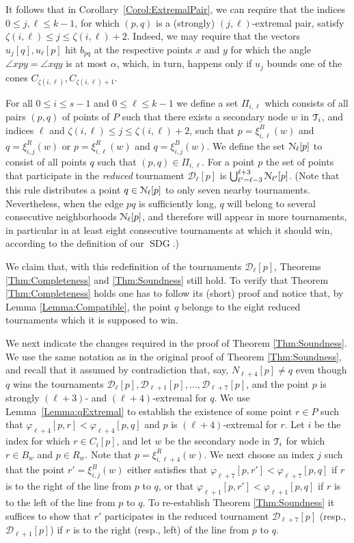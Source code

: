 \documentclass[letter,11pt]{article}
\def\NN{\EuScript{N}}
\def\dirtour{{\mathcal D}}
\def\T{\EuScript{T}}
\def\bisect{b}
\def\SDG{\mathop{\mathrm{SDG}}}
\begin{document}
It follows that in Corollary~\ref{Corol:ExtremalPair},
we can require that the indices $0\leq j,\ell\leq k-1$, for which
$(p,q)$ is a (strongly) $(j,\ell)$-extremal pair, satisfy 
$\zeta(i,\ell) \le j \le \zeta(i,\ell)+2$.  
Indeed, we may require that the vectors $u_j[q],u_{\ell}[p]$ hit $\bisect_{pq}$ at the respective points $x$ and $y$ for which the angle $\angle xpy=\angle xqy$ is at most $\alpha$, which, in turn, happens only if $u_j$ bounds one of the cones $C_{\zeta(i,\ell)},C_{\zeta(i,\ell)+1}$.


For all $0\le i \le s-1$ and $0\le \ell\leq k-1$ we define a set $\Pi_{i,\ell}$ which
consists of all pairs $(p,q)$ of points of $P$ such that there exists a
secondary node $w$ in $\T_i$, and indices $\ell$ and $\zeta(i,\ell)
\le j \le \zeta(i,\ell)+2$, such that $p=\xi_{i,\ell}^B(w)$ and
$q=\xi_{i,j}^R(w)$ or  $p=\xi_{i,\ell}^R(w)$
and $q=\xi_{i,j}^B(w)$.  We define the set $\NN_\ell[p]$ to consist of
all points $q$ such that  $(p,q) \in \Pi_{i,\ell}$.
For a point $p$ the set of points that participate in the 
{\em reduced} tournament $\dirtour_\ell[p]$ is 
$\bigcup_{\ell'=\ell-3}^{\ell+3} \NN_{\ell'}[p]$.
(Note that this rule distributes a point $q\in \NN_{\ell}[p]$ to only seven nearby tournaments. Nevertheless, when the edge $pq$ is sufficiently long, $q$ will belong to several consecutive neighborhoods $\NN_{\ell}[p]$, and therefore will appear in more tournaments, in particular in at least eight consecutive tournaments at which it should win, according to the definition of our $\SDG$.)


We claim that, with this redefinition of the tournaments
$\dirtour_\ell[p]$, Theorems \ref{Thm:Completeness} and \ref{Thm:Soundness} still hold.
To verify that  Theorem \ref{Thm:Completeness} holds one has to follow its (short) proof and
notice that, by Lemma 
\ref{Lemma:Compatible}, the point $q$  belongs to the eight reduced tournaments 
which it is supposed to win.

We next indicate the changes required in the proof of Theorem
\ref{Thm:Soundness}. We use the same notation as in the original
proof of Theorem \ref{Thm:Soundness}, and recall that it assumed by contradiction that, say,
$N_{\ell+4}[p]\neq q$ even though $q$ wins the tournaments
$\dirtour_\ell[p],\dirtour_{\ell+1}[p],\ldots,\dirtour_{\ell+7}[p]$,
and the point $p$ is strongly $(\ell+3)$- and $(\ell+4)$-extremal for
$q$. 
We use
Lemma~\ref{Lemma:qExtremal} to establish the existence of some point
$r\in P$ such that $\varphi_{\ell+4}[p,r]<\varphi_{\ell+4}[p,q]$ and $p$ is
$(\ell+4)$-extremal for $r$.  Let $i$ be the index for which $r\in C_i[p]$, and let $w$ be the secondary node in $\T_i$ for which $r\in B_w$
and $p\in R_w$.  Note that $p=\xi_{i,\ell+4}^R(w)$.  We next choose an
 index $j$ such that the point $r'=\xi_{i,j}^B(w)$ either satisfies 
that
$\varphi_{\ell+7}[p,r']<\varphi_{\ell+7}[p,q]$ if $r$ is to the
right of the line from $p$ to $q$,  or that
$\varphi_{\ell+1}[p,r']<\varphi_{\ell+1}[p,q]$ if $r$ is to the
left of the line from $p$ to $q$.  To re-establish Theorem \ref{Thm:Soundness} it suffices to show that
$r'$ participates in the reduced tournament $\dirtour_{\ell+7}[p]$ (resp., $\dirtour_{\ell+1}[p]$) if $r$ is to the
right (resp., left) of the line from $p$ to $q$.
\end{document}
